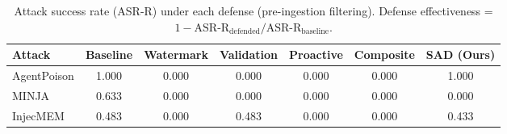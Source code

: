 \begin{table}[t]
\centering
\small
\caption{Attack success rate (ASR-R) under each defense (pre-ingestion filtering). Defense effectiveness = $1 - \text{ASR-R}_{\text{defended}} / \text{ASR-R}_{\text{baseline}}$.}
\label{tab:attack_defense_matrix}
\begin{tabular}{l|c|ccccc}
\toprule
Attack & Baseline & Watermark & Validation & Proactive & Composite & SAD (Ours) \\
\midrule
AgentPoison & 1.000 & 0.000 & 0.000 & 0.000 & 0.000 & 1.000 \\
MINJA & 0.633 & 0.000 & 0.000 & 0.000 & 0.000 & 0.000 \\
InjecMEM & 0.483 & 0.000 & 0.483 & 0.000 & 0.000 & 0.433 \\
\bottomrule
\end{tabular}
\end{table}
